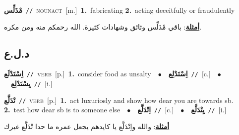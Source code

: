 \documentclass[10pt,a4paper,twoside]{article} %
\begin{document}
\begin{multicols}{2}
{\setlength\topsep{0pt}\textbf{\foreignlanguage{arabic}{مْدَلِّس}}\ {\color{gray}\texttt{//}\color{black}}\ \textsc{noun\textunderscore act}\ [m.]\ \textbf{1.}~fabricating  \textbf{2.}~acting deceitfully or fraudulently\  \begin{flushright}\color{gray}\foreignlanguage{arabic}{\textbf{\underline{\foreignlanguage{arabic}{أمثلة}}}: باقي مْدَلِّس وثائق وشهادات كثيرة. الله رحمكم منه ومن مكره.}\end{flushright}\color{black}} \vspace{2mm}

\vspace{-3mm}
\subsection*{\color{blue}\foreignlanguage{arabic}{د.ل.ع}\color{blue}{}} 

{\setlength\topsep{0pt}\textbf{\foreignlanguage{arabic}{اِسْتَدْلَع}}\ {\color{gray}\texttt{//}\color{black}}\ \textsc{verb}\ [p.]\ \textbf{1.}~consider food as unsalty\ \ $\bullet$\ \ \setlength\topsep{0pt}\textbf{\foreignlanguage{arabic}{اِسْتَدْلِع}}\ {\color{gray}\texttt{//}\color{black}}\ [c.]\ \ $\bullet$\ \ \setlength\topsep{0pt}\textbf{\foreignlanguage{arabic}{يِسْتَدْلِع}}\ {\color{gray}\texttt{//}\color{black}}\ [i.]\ } \vspace{2mm}

{\setlength\topsep{0pt}\textbf{\foreignlanguage{arabic}{تْدَلَّع}}\ {\color{gray}\texttt{//}\color{black}}\ \textsc{verb}\ [p.]\ \textbf{1.}~act luxuriosly and show how dear you are towards sb.  \textbf{2.}~test how dear sb is to someone else\ \ $\bullet$\ \ \setlength\topsep{0pt}\textbf{\foreignlanguage{arabic}{اِتْدَلَّع}}\ {\color{gray}\texttt{//}\color{black}}\ [c.]\ \ $\bullet$\ \ \setlength\topsep{0pt}\textbf{\foreignlanguage{arabic}{يِتْدَلَّع}}\ {\color{gray}\texttt{//}\color{black}}\ [i.]\  \begin{flushright}\color{gray}\foreignlanguage{arabic}{\textbf{\underline{\foreignlanguage{arabic}{أمثلة}}}: والله واِتْدَلَّع يا كايدهم يجعل عمره ما حدا تْدَلَّع غيرك}\end{flushright}\color{black}} \vspace{2mm}


\end{multicols}
\end{document}
